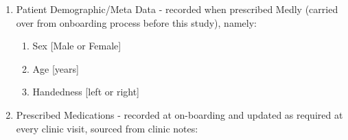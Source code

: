 \documentclass[]{article}
\begin{document}
\begin{enumerate}
	\item Patient Demographic/Meta Data - recorded when prescribed Medly (carried over from onboarding process before this study), namely:
		\begin{enumerate}
			\item Sex [Male or Female]
			\item Age [years]
			\item Handedness [left or right]
		\end{enumerate}
	\item Prescribed Medications - recorded at on-boarding and updated as required at every clinic visit, sourced from clinic notes:
	\begin{enumerate}

\end{enumerate}
\end{enumerate}
\end{document}
